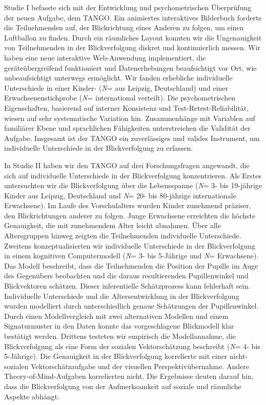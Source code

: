 \documentclass[
]{scrbook}
\begin{document}
Studie I befasste sich mit der Entwicklung und psychometrischen Überprüfung der neuen Aufgabe, dem TANGO. Ein animiertes interaktives Bilderbuch forderte die Teilnehmenden auf, der Blickrichtung eines Anderen zu folgen, um einen Luftballon zu finden. Durch ein räumliches Layout konnten wir die Ungenauigkeit von Teilnehmenden in der Blickverfolgung diskret und kontinuierlich messen. Wir haben eine neue interaktive Web-Anwendung implementiert, die geräteübergreifend funktioniert und Datenerhebungen beaufsichtigt vor Ort, wie unbeaufsichtigt unterwegs ermöglicht. Wir fanden erhebliche individuelle Unterschiede in einer Kinder- (\emph{N}\thinspace= aus Leipzig, Deutschland) und einer Erwachsenenstichprobe (\emph{N}\thinspace = international verteilt). Die psychometrischen Eigenschaften, basierend auf interner Konsistenz und Test-Retest-Reliabilität, wiesen auf sehr systematische Variation hin. Zusammenhänge mit Variablen auf familiärer Ebene und sprachlichen Fähigkeiten unterstreichen die Validität der Aufgabe. Insgesamt ist der TANGO ein zuverlässiges und valides Instrument, um individuelle Unterschiede in der Blickverfolgung zu erfassen.

In Studie II haben wir den TANGO auf drei Forschungsfragen angewandt, die sich auf individuelle Unterschiede in der Blickverfolgung konzentrieren. Als Erstes untersuchten wir die Blickverfolgung über die Lebensspanne (\emph{N}\thinspace = 3- bis 19-jährige Kinder aus Leipzig, Deutschland und \emph{N}\thinspace = 20- bis 80-jährige internationale Erwachsene). Im Laufe des Vorschulalters wurden Kinder zunehmend präziser, den Blickrichtungen anderer zu folgen. Junge Erwachsene erreichten die höchste Genauigkeit, die mit zunehmendem Alter leicht abnahmen. Über alle Altersgruppen hinweg zeigten die Teilnehmenden individuelle Unterschiede. Zweitens konzeptualisierten wir individuelle Unterschiede in der Blickverfolgung in einem kognitiven Computermodell (\emph{N}\thinspace = 3- bis 5-Jährige und \emph{N}\thinspace = Erwachsene). Das Modell beschreibt, dass die Teilnehmenden die Position der Pupille im Auge des Gegenübers beobachten und die daraus resultierenden Pupillenwinkel und Blickvektoren schätzen. Dieser inferentielle Schätzprozess kann fehlerhaft sein. Individuelle Unterschiede und die Altersentwicklung in der Blickverfolgung wurden modelliert durch unterschiedlich genaue Schätzungen der Pupillenwinkel. Durch einen Modellvergleich mit zwei alternativen Modellen und einem Signaturmuster in den Daten konnte das vorgeschlagene Blickmodell klar bestätigt werden. Drittens testeten wir empirisch die Modellannahme, die Blickverfolgung als eine Form der sozialen Vektorschätzung beschreibt (\emph{N}\thinspace = 4- bis 5-Jährige). Die Genauigkeit in der Blickverfolgung korrelierte mit einer nicht-sozialen Vektorschätzaufgabe und der visuellen Perspektivübernahme. Andere Theory-of-Mind-Aufgaben korrelierten nicht. Die Ergebnisse deuten darauf hin, dass die Blickverfolgung von der Aufmerksamkeit auf soziale und räumliche Aspekte abhängt.
\end{document}
